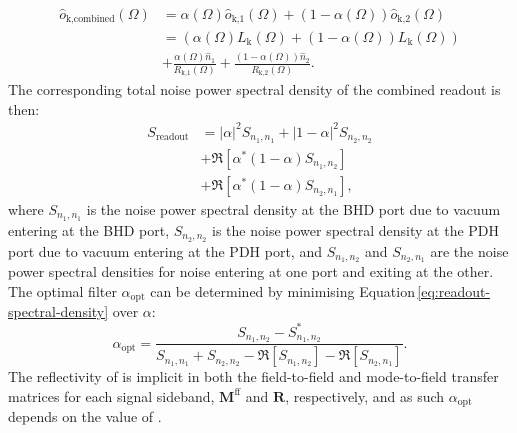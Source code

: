 \begin{equation}
  \begin{split}
    \hat{o}_{\textrm{k,combined}} \left( \Omega \right) &= \alpha\left( \Omega \right) \hat{o}_{\textrm{k,1}} \left( \Omega \right) + \left( 1 - \alpha\left( \Omega \right) \right) \hat{o}_{\textrm{k,2}} \left( \Omega \right) \\
    &= \left( \alpha\left( \Omega \right) L_{\textrm{k}} \left( \Omega \right) + \left(1 - \alpha\left( \Omega \right) \right) L_{\textrm{k}} \left( \Omega \right) \right) \\
    &+ \frac{\alpha\left( \Omega \right) \hat{n}_{\textrm{1}}}{R_{\textrm{k,1}}\left(\Omega\right)} + \frac{\left( 1 - \alpha\left( \Omega \right) \right) \hat{n}_{\textrm{2}}}{R_{\textrm{k,2}} \left(\Omega\right)}.
  \end{split}
\end{equation}      
The corresponding total noise power spectral density of the combined readout is then:
\begin{equation}
  \label{eq:readout-spectral-density}
  \begin{split}
    S_{\textrm{readout}} &= \left| \alpha \right|^{2} S_{n_{1},n_{1}} + \left| 1 - \alpha \right|^{2} S_{n_{2},n_{2}} \\
    &+ \Re \left[ \alpha^* \left(1 - \alpha \right) S_{n_{1},n_{2}} \right] \\
    &+ \Re \left[ \alpha^* \left(1 - \alpha \right) S_{n_{2},n_{1}} \right],
  \end{split}
\end{equation}
where $S_{n_{1},n_{1}}$ is the noise power spectral density at the \gls{BHD} port due to vacuum entering at the \gls{BHD} port, $S_{n_{2},n_{2}}$ is the noise power spectral density at the \gls{PDH} port due to vacuum entering at the \gls{PDH} port, and $S_{n_{1},n_{2}}$ and $S_{n_{2},n_{1}}$ are the noise power spectral densities for noise entering at one port and exiting at the other. The optimal filter $\alpha_{\textrm{opt}}$ can be determined by minimising Equation\,\ref{eq:readout-spectral-density} over $\alpha$:
\begin{equation}
  \label{eq:optimal-filter}
  \alpha_{\textrm{opt}} = \frac{S_{n_{1},n_{2}} - S^*_{n_{1},n_{2}}}{S_{n_{1},n_{1}} + S_{n_{2},n_{2}} - \Re \left[ S_{n_{1},n_{2}} \right] - \Re \left[ S_{n_{2},n_{1}} \right]}.
\end{equation}
The reflectivity of \MNINE{} is implicit in both the field-to-field and mode-to-field transfer matrices for each signal sideband, $\mathbf{M}^{\textrm{ff}}$ and $\mathbf{R}$, respectively, and as such $\alpha_{\textrm{opt}}$ depends on the value of \MNINE{}.

